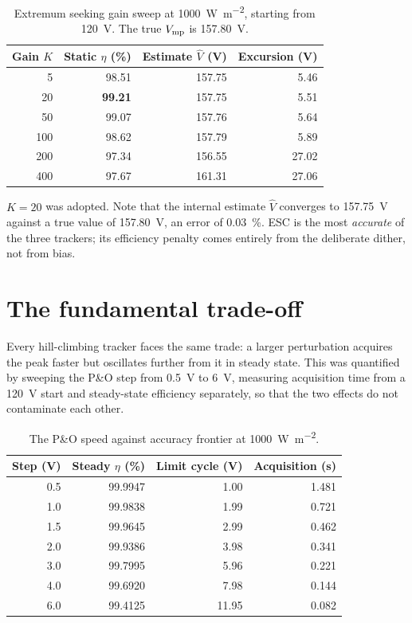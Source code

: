 \begin{table}[htbp]
\centering
\caption{Extremum seeking gain sweep at \SI{1000}{\watt\per\square\metre}, starting from \SI{120}{\volt}. The true $V_{\mathrm{mp}}$ is \SI{157.80}{\volt}.}
\label{tab:escgain}
\begin{tabular}{@{}rrrr@{}}
\toprule
Gain $K$ & Static $\eta$ (\si{\percent}) & Estimate $\hat V$ (\si{\volt}) & Excursion (\si{\volt}) \\
\midrule
5   & 98.51 & 157.75 & 5.46 \\
20  & \textbf{99.21} & 157.75 & 5.51 \\
50  & 99.07 & 157.76 & 5.64 \\
100 & 98.62 & 157.79 & 5.89 \\
200 & 97.34 & 156.55 & 27.02 \\
400 & 97.67 & 161.31 & 27.06 \\
\bottomrule
\end{tabular}
\end{table}

$K = 20$ was adopted. Note that the internal estimate $\hat V$ converges to
\SI{157.75}{\volt} against a true value of \SI{157.80}{\volt}, an error of
\SI{0.03}{\percent}. ESC is the most \emph{accurate} of the three trackers; its
efficiency penalty comes entirely from the deliberate dither, not from bias.

\section{The fundamental trade-off}
\label{sec:tradeoff}

Every hill-climbing tracker faces the same trade: a larger perturbation acquires
the peak faster but oscillates further from it in steady state. This was
quantified by sweeping the P\&O step from \SI{0.5}{\volt} to \SI{6}{\volt},
measuring acquisition time from a \SI{120}{\volt} start and steady-state
efficiency separately, so that the two effects do not contaminate each other.

\begin{table}[htbp]
\centering
\caption{The P\&O speed against accuracy frontier at \SI{1000}{\watt\per\square\metre}.}
\label{tab:tradeoff}
\begin{tabular}{@{}rrrr@{}}
\toprule
Step (\si{\volt}) & Steady $\eta$ (\si{\percent}) & Limit cycle (\si{\volt}) & Acquisition (\si{\second}) \\
\midrule
0.5 & 99.9947 & 1.00  & 1.481 \\
1.0 & 99.9838 & 1.99  & 0.721 \\
1.5 & 99.9645 & 2.99  & 0.462 \\
2.0 & 99.9386 & 3.98  & 0.341 \\
3.0 & 99.7995 & 5.96  & 0.221 \\
4.0 & 99.6920 & 7.98  & 0.144 \\
6.0 & 99.4125 & 11.95 & 0.082 \\
\bottomrule
\end{tabular}
\end{table}

